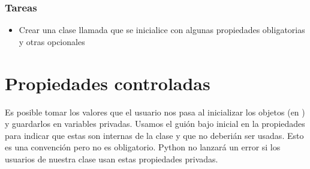 \documentclass[a5paper,9pt,spanish]{sphinxmanual}
\begin{document}
\subsection{Tareas}
\label{\detokenize{class:tareas}}\begin{itemize}
\item {} 
\sphinxAtStartPar
Crear una clase llamada  que se inicialice con algunas propiedades obligatorias y otras opcionales

\end{itemize}

\sphinxstepscope


\chapter{Propiedades controladas}
\label{\detokenize{class-props:propiedades-controladas}}\label{\detokenize{class-props::doc}}
\sphinxAtStartPar
Es posible tomar los valores que el usuario nos pasa al inicializar los objetos
(en ) y guardarlos en variables privadas. Usamos el guión bajo inicial
en la propiedades para indicar que estas son internas de la clase y que no deberián
ser usadas. Esto es una convención pero no es obligatorio. Python no lanzará un error
si los usuarios de nuestra clase usan estas propiedades privadas.

%
\begin{sphinxVerbatim}[commandchars=\\\{\},numbers=left,firstnumber=1,stepnumber=1]
 
       
          
          

     
         

     
         
\end{sphinxVerbatim}
\sphinxresetverbatimhllines
\end{document}
